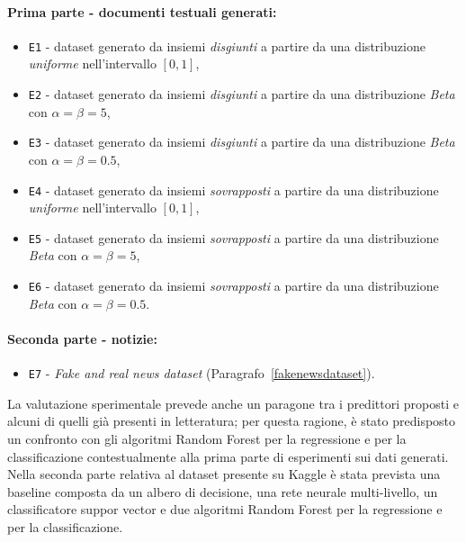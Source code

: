 \documentclass[12pt]{report}
\theoremstyle{definition}
\begin{document}
\paragraph{Prima parte - documenti testuali generati:}
\begin{itemize}
    \item \texttt{E1} - dataset generato da insiemi \textit{disgiunti} a partire da una distribuzione \textit{uniforme} nell'intervallo $[0,1]$,
    \item \texttt{E2} - dataset generato da insiemi \textit{disgiunti} a partire da una distribuzione \textit{Beta} con $\alpha=\beta=5$,
    \item \texttt{E3} - dataset generato da insiemi \textit{disgiunti} a partire da una distribuzione \textit{Beta} con $\alpha=\beta=0.5$,
    \item \texttt{E4} - dataset generato da insiemi \textit{sovrapposti} a partire da una distribuzione \textit{uniforme} nell'intervallo $[0,1]$,
    \item \texttt{E5} - dataset generato da insiemi \textit{sovrapposti} a partire da una distribuzione \textit{Beta} con $\alpha=\beta=5$,
    \item \texttt{E6} - dataset generato da insiemi \textit{sovrapposti} a partire da una distribuzione \textit{Beta} con $\alpha=\beta=0.5$.
\end{itemize}
\paragraph{Seconda parte - notizie:}
\begin{itemize}
    \item \texttt{E7} - \textit{Fake and real news dataset} (Paragrafo~\ref{fakenewsdataset}).
\end{itemize}
La valutazione sperimentale prevede anche un paragone tra i predittori proposti e alcuni di quelli già presenti in letteratura; per questa ragione, è stato predisposto un confronto con gli algoritmi Random Forest per la regressione e per la classificazione contestualmente alla prima parte di esperimenti sui dati generati. Nella seconda parte relativa al dataset presente su Kaggle è stata prevista una baseline composta da un albero di decisione, una rete neurale multi-livello, un classificatore suppor vector e due algoritmi Random Forest per la regressione e per la classificazione.
\end{document}
